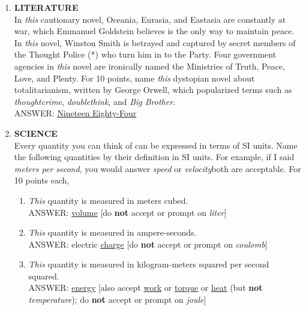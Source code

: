 \documentclass{report}
\newcommand*{\backtrack}{\setcounter{enumi}{\numexpr\theenumi-1\relax}}
\begin{document}
\begin{enumerate}
    \item \textbf{LITERATURE} \\ In \textit{this} cautionary novel, Oceania, Eurasia, and Eastasia are constantly at war, which Emmanuel Goldstein believes is the only way to maintain peace. In \textit{this} novel, Winston Smith is betrayed and captured by secret members of the Thought Police (*) who turn him in to the Party. Four government agencies in \textit{this} novel are ironically named the Ministries of Truth, Peace, Love, and Plenty. For 10 points, name \textit{this} dystopian novel about totalitarianism, written by George Orwell, which popularized terms such as \textit{thoughtcrime}, \textit{doublethink}, and \textit{Big Brother}. \\ ANSWER: \underline{Nineteen Eighty-Four} \backtrack
    \item \textbf{SCIENCE} \\ Every quantity you can think of can be expressed in terms of SI units. Name the following quantities by their definition in SI units. For example, if I said \textit{meters per second}, you would answer \textit{speed} or \textit{velocity}\textemdash both are acceptable. For 10 points each,
    \begin{enumerate}[label=\Alph*]
        \item \textit{This} quantity is measured in meters cubed. \\ ANSWER: \underline{volume} [do \textbf{not} accept or prompt on \textit{liter}]
        \item \textit{This} quantity is measured in ampere-seconds. \\ ANSWER: electric \underline{charge} [do \textbf{not} accept or prompt on \textit{coulomb}]
        \item \textit{This} quantity is measured in kilogram-meters squared per second squared. \\ ANSWER: \underline{energy} [also accept \underline{work} or \underline{torque} or \underline{heat} (but \textbf{not} \textit{temperature}); do \textbf{not} accept or prompt on \textit{joule}]
    \end{enumerate} 


\end{enumerate}
\end{document}
